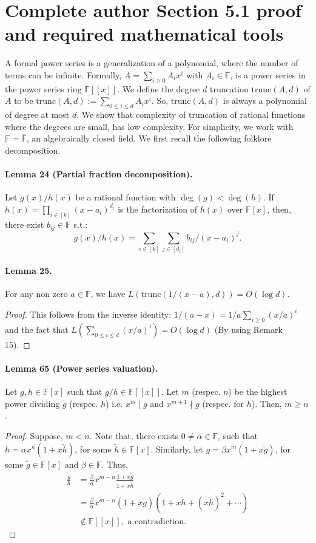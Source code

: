 \section*{Complete author Section 5.1 proof and required mathematical tools}
A formal power series is a generalization of a polynomial, where the number of terms can be infinite. Formally, $A=\sum_{i\ge0}A_ix^i$ with $A_i\in\mathbb F$, is a power series in the power series ring $\mathbb F[[x]]$. We define the degree $d$ truncation $\mathrm{trunc}(A,d)$ of $A$ to be $\mathrm{trunc}(A,d):=\sum_{0\le i\le d}A_ix^i$. So, $\mathrm{trunc}(A,d)$ is always a polynomial of degree at most $d$.
We show that complexity of truncation of rational functions where the degrees are small, has low complexity. For simplicity, we work with $\mathbb F=\overline{\mathbb F}$, an algebraically closed field. We first recall the following folklore decomposition.
\paragraph{Lemma 24 (Partial fraction decomposition).} Let $g(x)/h(x)$ be a rational function with $\deg(g)<\deg(h)$. If $h(x)=\prod_{i\in[k]}(x-a_i)^{d_i}$ is the factorization of $h(x)$ over $\mathbb F[x]$, then, there exist $b_{ij}\in\mathbb F$ s.t.:
\[g(x)/h(x)=\sum_{i\in[k]}\sum_{j\in[d_i]}b_{ij}/(x-a_i)^j.\]
\paragraph{Lemma 25.} For any non zero $a\in\mathbb F$, we have $L(\mathrm{trunc}(1/(x-a),d))=O(\log d)$.
\begin{proof}This follows from the inverse identity: $1/(a-x)=1/a\sum_{i\ge0}(x/a)^i$ and the fact that $L(\sum_{0\le i\le d}(x/a)^i)=O(\log d)$ (By using Remark 15).\end{proof}
\paragraph{Lemma 65 (Power series valuation).} Let $g,h\in\mathbb F[x]$ such that $g/h\in\mathbb F[[x]]$. Let $m$ (respec. $n$) be the highest power dividing $g$ (respec. $h$) i.e. $x^m\mid g$ and $x^{m+1}\nmid g$ (respec. for $h$). Then, $m\ge n$.
\begin{proof}Suppose, $m<n$. Note that, there exists $0\ne\alpha\in\mathbb F$, such that $h=\alpha x^n(1+x\widetilde h)$, for some $\widetilde h\in\mathbb F[x]$. Similarly, let $g=\beta x^m(1+x\widetilde g)$, for some $\widetilde g\in\mathbb F[x]$ and $\beta\in\mathbb F$. Thus,
\begin{align*}\frac gh&=\frac\beta\alpha x^{m-n}\frac{1+x\widetilde g}{1+x\widetilde h}\\&=\frac\beta\alpha x^{m-n}(1+x\widetilde g)(1+x\widetilde h+(x\widetilde h)^2+\cdots)\\&\notin\mathbb F[[x]],\text{ a contradiction}.\end{align*}\end{proof}
